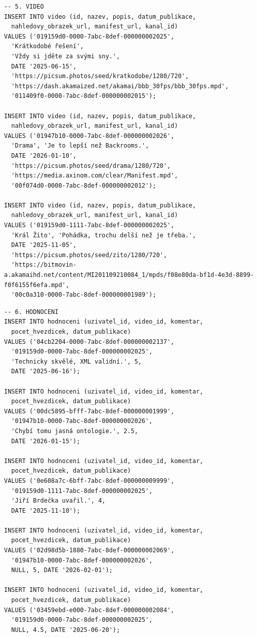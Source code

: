\documentclass[12pt,a4paper]{article}
\begin{document}
\begin{lstlisting}
-- 5. VIDEO
INSERT INTO video (id, nazev, popis, datum_publikace,
  nahledovy_obrazek_url, manifest_url, kanal_id)
VALUES ('019159d0-0000-7abc-8def-000000002025',
  'Krátkodobé řešení',
  'Vždy si jděte za svými sny.',
  DATE '2025-06-15',
  'https://picsum.photos/seed/kratkodobe/1280/720',
  'https://dash.akamaized.net/akamai/bbb_30fps/bbb_30fps.mpd',
  '011409f0-0000-7abc-8def-000000002015');

INSERT INTO video (id, nazev, popis, datum_publikace,
  nahledovy_obrazek_url, manifest_url, kanal_id)
VALUES ('01947b10-0000-7abc-8def-000000002026',
  'Drama', 'Je to lepší než Backrooms.',
  DATE '2026-01-10',
  'https://picsum.photos/seed/drama/1280/720',
  'https://media.axinom.com/clear/Manifest.mpd',
  '00f074d0-0000-7abc-8def-000000002012');

INSERT INTO video (id, nazev, popis, datum_publikace,
  nahledovy_obrazek_url, manifest_url, kanal_id)
VALUES ('019159d0-1111-7abc-8def-000000002025',
  'Král Žito', 'Pohádka, trochu delší než je třeba.',
  DATE '2025-11-05',
  'https://picsum.photos/seed/zito/1280/720',
  'https://bitmovin-a.akamaihd.net/content/MI201109210084_1/mpds/f08e80da-bf1d-4e3d-8899-f0f6155f6efa.mpd',
  '00c0a310-0000-7abc-8def-000000001989');
\end{lstlisting}

\begin{lstlisting}
-- 6. HODNOCENI
INSERT INTO hodnoceni (uzivatel_id, video_id, komentar,
  pocet_hvezdicek, datum_publikace)
VALUES ('04cb2204-0000-7abc-8def-000000002137',
  '019159d0-0000-7abc-8def-000000002025',
  'Technicky skvělé, XML validní.', 5,
  DATE '2025-06-16');

INSERT INTO hodnoceni (uzivatel_id, video_id, komentar,
  pocet_hvezdicek, datum_publikace)
VALUES ('00dc5895-bfff-7abc-8def-000000001999',
  '01947b10-0000-7abc-8def-000000002026',
  'Chybí tomu jasná ontologie.', 2.5,
  DATE '2026-01-15');

INSERT INTO hodnoceni (uzivatel_id, video_id, komentar,
  pocet_hvezdicek, datum_publikace)
VALUES ('0e608a7c-6bff-7abc-8def-000000009999',
  '019159d0-1111-7abc-8def-000000002025',
  'Jiří Brdečka uvařil.', 4,
  DATE '2025-11-10');

INSERT INTO hodnoceni (uzivatel_id, video_id, komentar,
  pocet_hvezdicek, datum_publikace)
VALUES ('02d98d5b-1880-7abc-8def-000000002069',
  '01947b10-0000-7abc-8def-000000002026',
  NULL, 5, DATE '2026-02-01');

INSERT INTO hodnoceni (uzivatel_id, video_id, komentar,
  pocet_hvezdicek, datum_publikace)
VALUES ('03459ebd-e000-7abc-8def-000000002084',
  '019159d0-0000-7abc-8def-000000002025',
  NULL, 4.5, DATE '2025-06-20');
\end{lstlisting}
\end{document}
